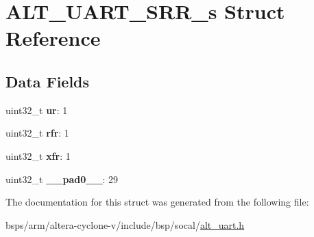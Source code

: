 \hypertarget{structALT__UART__SRR__s}{}\section{A\+L\+T\+\_\+\+U\+A\+R\+T\+\_\+\+S\+R\+R\+\_\+s Struct Reference}
\label{structALT__UART__SRR__s}
\subsection*{Data Fields}
\begin{DoxyCompactItemize}
\item 
\mbox{\label{structALT__UART__SRR__s_af05b6e5e6a70e5e8872960f0c6e44287}} 
uint32\+\_\+t {\bfseries ur}\+: 1
\item 
\mbox{\label{structALT__UART__SRR__s_ad46335ee3f9ffbd77ae3211c8b597944}} 
uint32\+\_\+t {\bfseries rfr}\+: 1
\item 
\mbox{\label{structALT__UART__SRR__s_a0778164c2feb477aec0c1f69324ac38c}} 
uint32\+\_\+t {\bfseries xfr}\+: 1
\item 
\mbox{\label{structALT__UART__SRR__s_a0f3a06c49b9bcd009dcab89a53f257d5}} 
uint32\+\_\+t {\bfseries \+\_\+\+\_\+pad0\+\_\+\+\_\+}\+: 29
\end{DoxyCompactItemize}


The documentation for this struct was generated from the following file\+:\begin{DoxyCompactItemize}
\item 
bsps/arm/altera-\/cyclone-\/v/include/bsp/socal/\mbox{\hyperlink{alt__uart_8h}{alt\+\_\+uart.\+h}}\end{DoxyCompactItemize}

